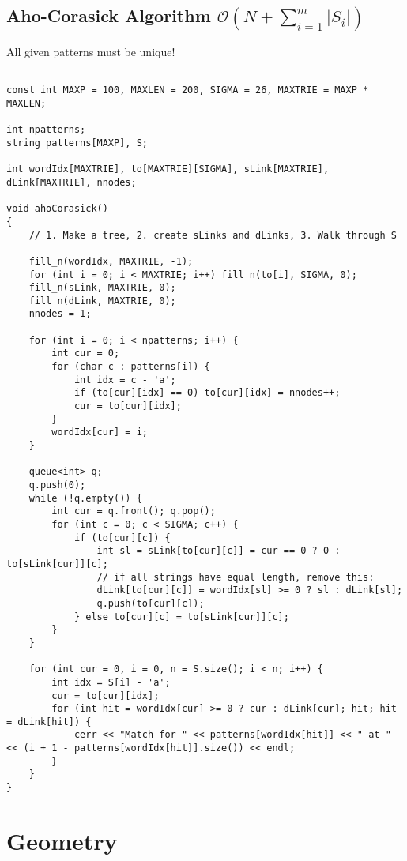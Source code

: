 \documentclass{article}
\begin{document}
\subsection{Aho-Corasick Algorithm $\mathcal{O}(N + \sum_{i=1}^{m} |S_i|)$}

All given patterns must be unique!

\begin{lstlisting}

const int MAXP = 100, MAXLEN = 200, SIGMA = 26, MAXTRIE = MAXP * MAXLEN;

int npatterns;
string patterns[MAXP], S;

int wordIdx[MAXTRIE], to[MAXTRIE][SIGMA], sLink[MAXTRIE], dLink[MAXTRIE], nnodes;

void ahoCorasick()
{
    // 1. Make a tree, 2. create sLinks and dLinks, 3. Walk through S

    fill_n(wordIdx, MAXTRIE, -1);
    for (int i = 0; i < MAXTRIE; i++) fill_n(to[i], SIGMA, 0);
    fill_n(sLink, MAXTRIE, 0);
    fill_n(dLink, MAXTRIE, 0);
    nnodes = 1;

    for (int i = 0; i < npatterns; i++) {
        int cur = 0;
        for (char c : patterns[i]) {
            int idx = c - 'a';
            if (to[cur][idx] == 0) to[cur][idx] = nnodes++;
            cur = to[cur][idx];
        }
        wordIdx[cur] = i;
    }

    queue<int> q;
    q.push(0);
    while (!q.empty()) {
        int cur = q.front(); q.pop();
        for (int c = 0; c < SIGMA; c++) {
            if (to[cur][c]) {
                int sl = sLink[to[cur][c]] = cur == 0 ? 0 : to[sLink[cur]][c];
                // if all strings have equal length, remove this:
                dLink[to[cur][c]] = wordIdx[sl] >= 0 ? sl : dLink[sl];
                q.push(to[cur][c]);
            } else to[cur][c] = to[sLink[cur]][c];
        }
    }

    for (int cur = 0, i = 0, n = S.size(); i < n; i++) {
        int idx = S[i] - 'a';
        cur = to[cur][idx];
        for (int hit = wordIdx[cur] >= 0 ? cur : dLink[cur]; hit; hit = dLink[hit]) {
            cerr << "Match for " << patterns[wordIdx[hit]] << " at " << (i + 1 - patterns[wordIdx[hit]].size()) << endl;
        }
    }
}
\end{lstlisting}

\section{Geometry}
\end{document}
